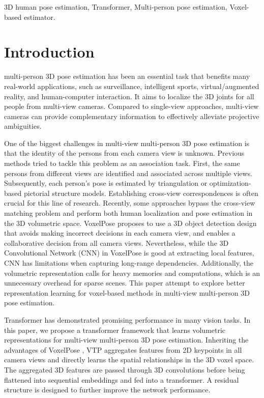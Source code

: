 \documentclass[lettersize,journal]{IEEEtran}
\begin{document}
\begin{IEEEkeywords}
3D human pose estimation, Transformer, Multi-person pose estimation, Voxel-based estimator.
\end{IEEEkeywords}

\section{Introduction}
 multi-person 3D pose estimation \cite{zhang2021direct} has been an essential task that benefits many
real-world applications, such as surveillance, intelligent sports, virtual/augmented reality, and human-computer interaction. It aims to localize the 3D joints for all people from multi-view cameras. Compared to single-view approaches, multi-view cameras can provide complementary information to effectively alleviate projective ambiguities.


One of the biggest challenges in multi-view multi-person 3D pose estimation is that the identity of the persons from each camera view is unknown. Previous methods \cite{dong2019fast,huang2020end} tried to tackle this problem as an association task. First, the same persons from different views are identiﬁed and associated across multiple views. Subsequently, each person's pose is estimated by triangulation or optimization-based
pictorial structure models. Establishing cross-view correspondences is often crucial for this line of research. Recently, some approaches \cite{tu2020voxelpose,wu2021graph} bypass the cross-view matching problem and perform both human localization and pose estimation in the 3D volumetric space. VoxelPose \cite{tu2020voxelpose} proposes to use a 3D object detection design that avoids making incorrect decisions in each camera view, and enables a collaborative decision from all camera views. Nevertheless, while the 3D Convolutional Network (CNN) in VoxelPose is good at extracting local features, CNN has limitations when capturing long-range dependencies. Additionally, the volumetric representation calls for heavy memories and computations, which is an unnecessary overhead for sparse scenes. This paper attempt to explore better representation learning for voxel-based methods in multi-view multi-person 3D pose estimation.

Transformer has demonstrated promising performance in many vision tasks. In this paper, we propose a transformer framework that learns volumetric representations for multi-view multi-person 3D pose estimation. Inheriting the advantages of VoxelPose \cite{tu2020voxelpose}, VTP aggregates features from 2D keypoints in all camera views and directly learns the spatial relationships in the 3D voxel space. The aggregated 3D features are passed through 3D convolutions before being flattened into sequential embeddings and fed into a transformer. A residual structure is designed to further improve the network performance. 
\end{document}
